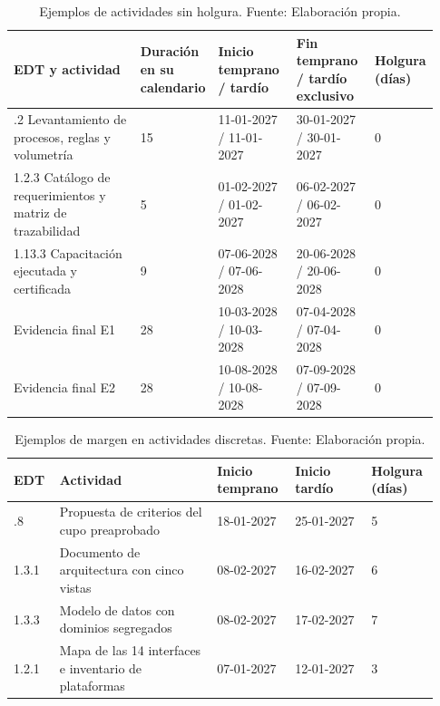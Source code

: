 \documentclass[11pt]{article}
\begin{document}
\begingroup
\small
\begin{longtable}{@{}p{0.34\linewidth}p{0.12\linewidth}p{0.19\linewidth}p{0.19\linewidth}p{0.09\linewidth}@{}}
\caption[Ejemplos de actividades sin holgura]{Ejemplos de actividades sin holgura. Fuente: Elaboración propia.}\label{tab:t15-13}\\
\toprule
\textbf{EDT y actividad} & \textbf{Duración en su calendario} & \textbf{Inicio temprano / tardío} & \textbf{Fin temprano / tardío exclusivo} & \textbf{Holgura (días)} \\
\midrule
\endhead
\bottomrule
\endlastfoot
1.2.2 Levantamiento de procesos, reglas y volumetría & 15 & 11-01-2027 / 11-01-2027 & 30-01-2027 / 30-01-2027 & 0 \\
1.2.3 Catálogo de requerimientos y matriz de trazabilidad & 5 & 01-02-2027 / 01-02-2027 & 06-02-2027 / 06-02-2027 & 0 \\
1.13.3 Capacitación ejecutada y certificada & 9 & 07-06-2028 / 07-06-2028 & 20-06-2028 / 20-06-2028 & 0 \\
 Evidencia final E1 & 28 & 10-03-2028 / 10-03-2028 & 07-04-2028 / 07-04-2028 & 0 \\
 Evidencia final E2 & 28 & 10-08-2028 / 10-08-2028 & 07-09-2028 / 07-09-2028 & 0 \\
\end{longtable}
\endgroup

\begingroup
\small
\begin{longtable}{@{}p{0.1\linewidth}p{0.35\linewidth}p{0.17\linewidth}p{0.17\linewidth}p{0.14\linewidth}@{}}
\caption[Ejemplos de margen en actividades discretas]{Ejemplos de margen en actividades discretas. Fuente: Elaboración propia.}\label{tab:t15-14}\\
\toprule
\textbf{EDT} & \textbf{Actividad} & \textbf{Inicio temprano} & \textbf{Inicio tardío} & \textbf{Holgura (días)} \\
\midrule
\endhead
\bottomrule
\endlastfoot
1.2.8 & Propuesta de criterios del cupo preaprobado & 18-01-2027 & 25-01-2027 & 5 \\
1.3.1 & Documento de arquitectura con cinco vistas & 08-02-2027 & 16-02-2027 & 6 \\
1.3.3 & Modelo de datos con dominios segregados & 08-02-2027 & 17-02-2027 & 7 \\
1.2.1 & Mapa de las 14 interfaces e inventario de plataformas & 07-01-2027 & 12-01-2027 & 3 \\
\end{longtable}
\endgroup
\end{document}
